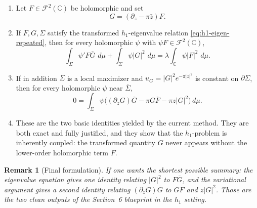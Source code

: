 \documentclass[11pt]{article}
\newtheorem{remark}[theorem]{Remark}
\newcommand{\C}{\mathbb C}
\newcommand{\F}{\mathcal F^2(\C)}
\newcommand{\dmu}{\,d\mu}
\newcommand{\pw}{\partial_z}
\newcommand{\1}{\mathbf 1}
\begin{document}
\begin{enumerate}[label=\textnormal{(\arabic*)}]
\item Let \(F\in\F\) be holomorphic and set
\[
G=(\pw-\pi\bar z)F.
\]

\item If \(F,G,\Sigma\) satisfy the transformed \(h_1\)-eigenvalue relation
\eqref{eq:h1-eigen-repeated}, then for every holomorphic \(\psi\) with \(\psi F\in\F\),
\[
\int_\Sigma \psi'F\overline G\,\dmu
+
\int_\Sigma \psi |G|^2\,\dmu
=
\lambda\int_\C \psi |F|^2\,\dmu.
\]

\item If in addition \(\Sigma\) is a local maximizer and \(u_G=|G|^2e^{-\pi|z|^2}\) is
constant on \(\partial\Sigma\), then for every holomorphic \(\psi\) near
\(\overline\Sigma\),
\[
0
=
\int_\Sigma
\psi\Big((\pw G)\overline G-\pi G\overline F-\pi z|G|^2\Big)\dmu.
\]

\item These are the two basic identities yielded by the current method. They are both
exact and fully justified, and they show that the \(h_1\)-problem is inherently
coupled: the transformed quantity \(G\) never appears without the lower-order
holomorphic term \(F\).
\end{enumerate}

\begin{remark}[Final formulation]
If one wants the shortest possible summary: the eigenvalue equation gives one identity
relating \(|G|^2\) to \(F\overline G\), and the variational argument gives a second
identity relating \((\pw G)\overline G\) to \(G\overline F\) and \(z|G|^2\). Those are
the two clean outputs of the Section~6 blueprint in the \(h_1\) setting.
\end{remark}
\end{document}
